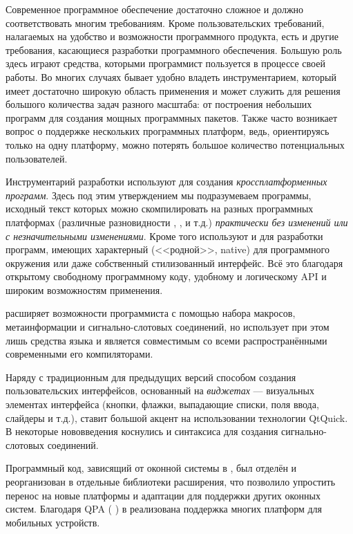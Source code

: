 Современное программное обеспечение достаточно сложное и должно соответствовать многим требованиям. 
Кроме пользовательских требований, налагаемых на удобство и возможности программного продукта, есть 
и другие требования, касающиеся разработки программного обеспечения. Большую роль здесь играют средства, 
которыми программист пользуется в
процессе своей работы. Во многих случаях бывает удобно владеть инструментарием, который имеет достаточно широкую
область применения и может служить для решения большого количества задач разного масштаба: от построения небольших
программ для создания мощных программных пакетов. Также часто возникает вопрос о поддержке нескольких программных
платформ, ведь, ориентируясь только на одну платформу, можно потерять большое количество потенциальных
пользователей.  

Инструментарий разработки  используют для создания \emph{кроссплатформенных программ}. Здесь под этим утверждением мы
подразумеваем программы, исходный текст которых  можно скомпилировать на разных
программных платформах (различные разновидности ,
,  и т.д.) \emph{практически без изменений или с незначительными изменениями}.
Кроме того  используют и для разработки программ, имеющих характерный
(<<родной>>, native) для программного окружения или даже собственный
стилизованный интерфейс. Всё это благодаря открытому свободному программному коду, удобному и 
логическому API и широким возможностям применения.

 расширяет возможности программиста с помощью набора макросов, метаинформации и сигнально-слотовых
соединений, но использует при этом лишь средства языка  и является совместимым со всеми распространёнными
современными его компиляторами. 

Наряду с традиционным для предыдущих версий  способом создания пользовательских интерфейсов, основанный
на \emph{виджетах} --- визуальных элементах интерфейса
(кнопки, флажки, выпадающие списки, поля ввода, слайдеры и т.д.),  ставит большой акцент на использовании технологии
QtQuick. В  некоторые нововведения коснулись и синтаксиса для создания сигнально-слотовых соединений.

Программный код, зависящий от оконной системы в , был отделён и реорганизован в отдельные библиотеки
расширения, что позволило упростить перенос  на новые платформы и адаптации для поддержки других оконных систем.
Благодаря QPA ( ) в  реализована поддержка многих платформ для мобильных устройств.


